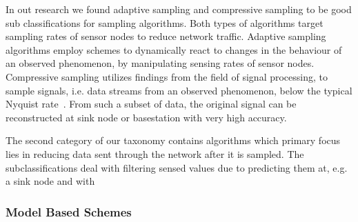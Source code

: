 In out research we found adaptive sampling and compressive sampling to be good
sub classifications for sampling algorithms. Both types of algorithms target
sampling rates of sensor nodes to reduce network traffic. Adaptive sampling
algorithms employ schemes to dynamically react to changes in the behaviour of
an observed phenomenon, by manipulating sensing rates of sensor nodes.
Compressive sampling utilizes findings from the field of signal processing, to
sample signals, i.e. data streams from an observed phenomenon, below the
typical Nyquist rate~\cite{candes2008introduction}. From such a subset of data,
the original signal can be reconstructed at sink node or basestation with very
high accuracy.

The second category of our taxonomy contains algorithms which primary focus
lies in reducing data sent through the network after it is sampled. The
subclassifications deal with filtering sensed values due to predicting them at,
e.g. a sink node and with %

\subsubsection{Model Based Schemes}
\label{sec:Model Based Schemes}

